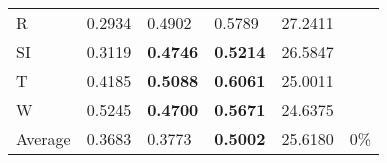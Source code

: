 \documentclass[11pt, a4paper]{article}
\begin{document}
\begin{table}[H]
\begin{tabular}{llllll}
R                                & 0.2934                            & 0.4902                            & 0.5789                               & 27.2411                                     &                                   \\
SI                        & 0.3119                            & \textbf{0.4746}                   & \textbf{0.5214}                      & 26.5847                                     &                                   \\
T                              & 0.4185                            & \textbf{0.5088}                   & \textbf{0.6061}                      & 25.0011                                     &                                   \\
W                             & 0.5245                            & \textbf{0.4700}                   & \textbf{0.5671}                      & 24.6375                                     &                                   \\ \hline
Average                               & 0.3683                            & 0.3773                            & \textbf{0.5002}                      & 25.6180                                     & 0\%
\end{tabular}
\end{table}
\end{document}
